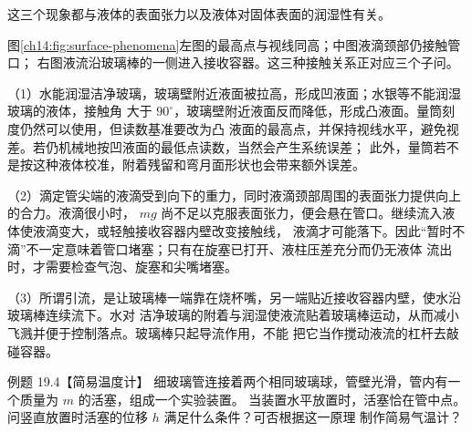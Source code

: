 \begin{xesolution}
这三个现象都与液体的表面张力以及液体对固体表面的润湿性有关。

图\ref{ch14:fig:surface-phenomena}左图的最高点与视线同高；中图液滴颈部仍接触管口；
右图液流沿玻璃棒的一侧进入接收容器。这三种接触关系正对应三个子问。
\surfacePhenomenaDiagram

（1）水能润湿洁净玻璃，玻璃壁附近液面被拉高，形成凹液面；水银等不能润湿玻璃的液体，接触角
大于 $90^\circ$，玻璃壁附近液面反而降低，形成凸液面。量筒刻度仍然可以使用，但读数基准要改为凸
液面的最高点，并保持视线水平，避免视差。若仍机械地按凹液面的最低点读数，当然会产生系统误差；
此外，量筒若不是按这种液体校准，附着残留和弯月面形状也会带来额外误差。

（2）滴定管尖端的液滴受到向下的重力，同时液滴颈部周围的表面张力提供向上的合力。液滴很小时，
$mg$ 尚不足以克服表面张力，便会悬在管口。继续流入液体使液滴变大，或轻触接收容器内壁改变接触线，
液滴才可能落下。因此“暂时不滴”不一定意味着管口堵塞；只有在旋塞已打开、液柱压差充分而仍无液体
流出时，才需要检查气泡、旋塞和尖嘴堵塞。

（3）所谓引流，是让玻璃棒一端靠在烧杯嘴，另一端贴近接收容器内壁，使水沿玻璃棒连续流下。水对
洁净玻璃的附着与润湿使液流贴着玻璃棒运动，从而减小飞溅并便于控制落点。玻璃棒只起导流作用，不能
把它当作搅动液流的杠杆去敲碰容器。
\end{xesolution}

\begin{origexamplebox}{例题 19.4【简易温度计】}
细玻璃管连接着两个相同玻璃球，管壁光滑，管内有一个质量为 $m$ 的活塞，组成一个实验装置。
当装置水平放置时，活塞恰在管中点。问竖直放置时活塞的位移 $h$ 满足什么条件？可否根据这一原理
制作简易气温计？
\end{origexamplebox}

